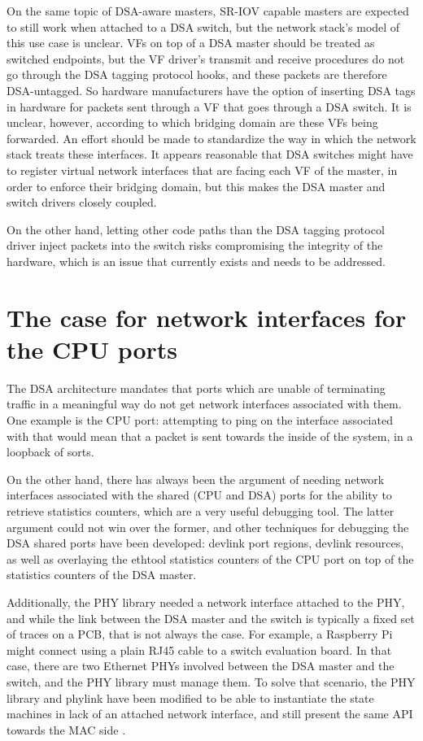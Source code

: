 \documentclass[letterpaper]{article}
\begin{document}
On the same topic of DSA-aware masters, SR-IOV capable masters are expected to
still work when attached to a DSA switch, but the network stack's model of this
use case is unclear. VFs on top of a DSA master should be treated as switched
endpoints, but the VF driver's transmit and receive procedures do not go
through the DSA tagging protocol hooks, and these packets are therefore
DSA-untagged. So hardware manufacturers have the option of inserting DSA tags
in hardware for packets sent through a VF that goes through a DSA switch. It is
unclear, however, according to which bridging domain are these VFs being
forwarded. An effort should be made to standardize the way in which the network
stack treats these interfaces. It appears reasonable that DSA switches might
have to register virtual network interfaces that are facing each VF of the
master, in order to enforce their bridging domain, but this makes the DSA
master and switch drivers closely coupled.

On the other hand, letting other code paths than the DSA tagging protocol
driver inject packets into the switch risks compromising the integrity of the
hardware, which is an issue that currently exists and needs to be addressed.

\section{The case for network interfaces for the CPU ports}

The DSA architecture mandates that ports which are unable of terminating
traffic in a meaningful way do not get network interfaces associated with them.
One example is the CPU port: attempting to ping on the interface associated
with that would mean that a packet is sent towards the inside of the system, in
a loopback of sorts.

On the other hand, there has always been the argument of needing network
interfaces associated with the shared (CPU and DSA) ports for the ability to
retrieve statistics counters, which are a very useful debugging tool. The
latter argument could not win over the former, and other techniques for
debugging the DSA shared ports have been developed: devlink port regions,
devlink resources, as well as overlaying the ethtool statistics counters of the
CPU port on top of the statistics counters of the DSA master.

Additionally, the PHY library needed a network interface attached to the PHY,
and while the link between the DSA master and the switch is typically a fixed
set of traces on a PCB, that is not always the case. For example, a Raspberry
Pi might connect using a plain RJ45 cable to a switch evaluation board. In that
case, there are two Ethernet PHYs involved between the DSA master and the
switch, and the PHY library must manage them. To solve that scenario, the PHY
library and phylink have been modified to be able to instantiate the state
machines in lack of an attached network interface, and still present the same
API towards the MAC side \cite{dsa-cpu-port-phylink}.
\end{document}

